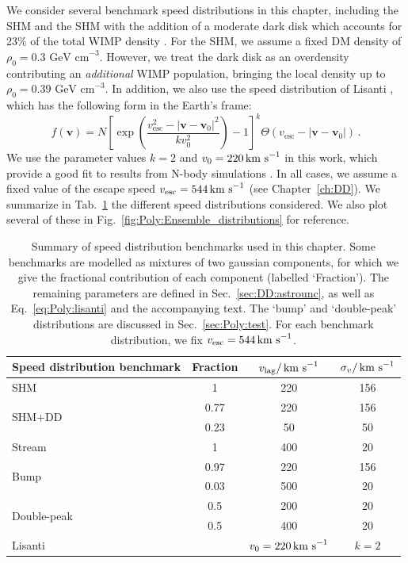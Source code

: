 We consider several benchmark speed distributions in this chapter, including the SHM and the SHM with the addition of a moderate dark disk which accounts for 23\% of the total WIMP density \cite{Bruch:2009}. For the SHM, we assume a fixed DM density of $\rho_0 = 0.3 \textrm{ GeV cm}^{-3}$. However, we treat the dark disk as an overdensity contributing an \textit{additional} WIMP population, bringing the local density up to $\rho_0 = 0.39 \textrm{ GeV cm}^{-3}$. In addition, we also use the speed distribution of Lisanti \etal \cite{Lisanti:2010}, which has the following form in the Earth's frame:
\begin{equation}
\label{eq:Poly:lisanti}
f(\textbf{v}) = N \left[\exp\left(\frac{v_\textrm{esc}^2 - |\textbf{v} - \textbf{v}_0|^2}{k v_0^2}\right) -1\right]^k \Theta(v_\textrm{esc} - |\textbf{v} - \textbf{v}_0|)\,.
\end{equation}
We use the parameter values $k = 2$ and $v_0 = 220 \,\textrm{km s}^{-1}$ in this work, which provide a good fit to results from N-body simulations \cite{Lisanti:2010}. In all cases, we assume a fixed value of the escape speed $\vesc = 544 \kms$ (see Chapter~\ref{ch:DD}). We summarize in Tab.~\ref{tab:Poly:distributions} the different speed distributions considered. We also plot several of these in Fig.~\ref{fig:Poly:Ensemble_distributions} for reference.

\begin{table}[t]
  \setlength{\extrarowheight}{2pt}
  \setlength{\tabcolsep}{3pt}
  \begin{center}
	\begin{tabular}{m{3cm}|ccc}
        \hline \hline
	Speed distribution benchmark & Fraction & $v_\textrm{lag} / \,\textrm{km s}^{-1}$ & $\sigma_v / \,\textrm{km s}^{-1}$ \\
        \hline
	SHM & 1 & 220 & 156 \\
	\hline
	\multirow{2}{*}{SHM+DD} & 0.77 & 220 & 156 \\
	& 0.23 & 50 & 50 \\
	\hline
	Stream & 1 & 400 & 20 \\
	\hline
	\multirow{2}{*}{Bump} & 0.97 & 220 & 156 \\
	& 0.03 & 500 & 20 \\
	\hline
	\multirow{2}{*}{Double-peak} & 0.5 & 200 & 20 \\
	& 0.5 & 400 & 20 \\
	\hline
	Lisanti \etal & & $v_0 = 220 \,\textrm{km s}^{-1}$ & $k = 2$ \\
        \hline \hline
	\end{tabular}

  \end{center}
\caption[Summary of speed distribution benchmarks used in Chapter \ref{ch:Poly}]{Summary of speed distribution benchmarks used in this chapter. Some benchmarks are modelled as mixtures of two gaussian components, for which we give the fractional contribution of each component (labelled `Fraction'). The remaining parameters are defined in Sec.~\ref{sec:DD:astrounc}, as well as Eq.~\ref{eq:Poly:lisanti} and the accompanying text. The `bump' and `double-peak' distributions are discussed in Sec.~\ref{sec:Poly:test}. For each benchmark distribution, we fix $\vesc = 544 \kms$.}
\label{tab:Poly:distributions}
\end{table}

